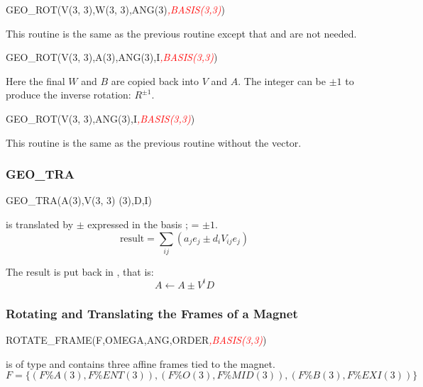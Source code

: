 \begin{ptccode}
GEO_ROT(V(3, 3),W(3, 3),ANG(3)\textit{\textcolor{red}{,BASIS(3,3)}})
\end{ptccode}

This routine is the same as the previous routine except that
 and  are not needed.

\begin{ptccode}
GEO_ROT(V(3, 3),A(3),ANG(3),I\textit{\textcolor{red}{,BASIS(3,3)}})
\end{ptccode}

Here the final $W$ and $B$ are copied back into $V$ and $A$. The
integer  can be $\pm1$ to produce the inverse rotation: $R^{\pm1}$.

\begin{ptccode}
GEO_ROT(V(3, 3),ANG(3),I\textit{\textcolor{red}{,BASIS(3,3)}})
\end{ptccode}

This routine is the same as the previous routine without the  vector.


\subsubsection{GEO\_TRA}

\begin{ptccode}
GEO_TRA(A(3),V(3, 3) (3),D,I)
\end{ptccode}

%
 is translated by $\pm$  expressed in the basis ;  = $\pm1$.
\begin{equation*}
  \text{result} = \sum_{ij} (a_j e_j \pm d_i V_{ij} e_j)
\end{equation*}

The result is put back in , that is:
\begin{equation*}
  A \leftarrow A \pm V^t D
\end{equation*}


\subsubsection{Rotating and Translating the Frames of a Magnet}

\begin{ptccode}
ROTATE_FRAME(F,OMEGA,ANG,ORDER\textit{\textcolor{red}{,BASIS(3,3)}})
\end{ptccode}

%
 is of type  and contains three affine frames tied
to the magnet.
\begin{equation*}
F = \lbrace ( F \% A(3), F \% ENT(3) ), ( F \% O(3), F \% MID(3) ), ( F \% B(3), F \% EXI(3) ) \rbrace
\end{equation*}


